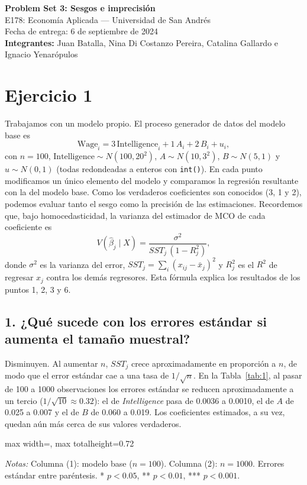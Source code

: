 \documentclass[11pt,a4paper]{article}
\newcommand{\tabla}[1]{\begin{adjustbox}{max width=\linewidth, max totalheight=0.72\textheight}\end{adjustbox}}
\newcommand{\notas}[1]{\par\vspace{0.3em}\begin{minipage}{0.92\linewidth}\footnotesize\textit{Notas:} #1\end{minipage}}
\begin{document}
\begin{center}
{\Large\bfseries Problem Set 3: Sesgos e imprecisión}\\[0.5em]
E178: Economía Aplicada --- Universidad de San Andrés\\
Fecha de entrega: 6 de septiembre de 2024\\[0.5em]
\textbf{Integrantes:} Juan Batalla, Nina Di Costanzo Pereira, Catalina Gallardo e Ignacio Yenarópulos
\end{center}

\section*{Ejercicio 1}

Trabajamos con un modelo propio. El proceso generador de datos del modelo base es
\[
\text{Wage}_i = 3\,\text{Intelligence}_i + 1\,A_i + 2\,B_i + u_i,
\]
con $n=100$, $\text{Intelligence}\sim N(100,20^2)$, $A\sim N(10,3^2)$, $B\sim N(5,1)$ y $u\sim N(0,1)$ (todas redondeadas a enteros con \texttt{int()}). En cada punto modificamos un único elemento del modelo y comparamos la regresión resultante con la del modelo base. Como los verdaderos coeficientes son conocidos (3, 1 y 2), podemos evaluar tanto el sesgo como la precisión de las estimaciones. Recordemos que, bajo homocedasticidad, la varianza del estimador de MCO de cada coeficiente es
\[
V(\hat\beta_j\mid X)=\frac{\sigma^2}{SST_j\,(1-R^2_j)},
\]
donde $\sigma^2$ es la varianza del error, $SST_j=\sum_i(x_{ij}-\bar x_j)^2$ y $R^2_j$ es el $R^2$ de regresar $x_j$ contra los demás regresores. Esta fórmula explica los resultados de los puntos 1, 2, 3 y 6.

\subsection*{1. ¿Qué sucede con los errores estándar si aumenta el tamaño muestral?}

Disminuyen. Al aumentar $n$, $SST_j$ crece aproximadamente en proporción a $n$, de modo que el error estándar cae a una tasa de $1/\sqrt{n}$. En la Tabla~\ref{tab:1}, al pasar de 100 a 1000 observaciones los errores estándar se reducen aproximadamente a un tercio ($1/\sqrt{10}\approx0.32$): el de \textit{Intelligence} pasa de 0.0036 a 0.0010, el de $A$ de 0.025 a 0.007 y el de $B$ de 0.060 a 0.019. Los coeficientes estimados, a su vez, quedan aún más cerca de sus valores verdaderos.

\begin{table}[H]\centering
\caption{Aumento del tamaño muestral}\label{tab:1}
\tabla{"../output/Tabla 1.tex"}
\notas{Columna (1): modelo base ($n=100$). Columna (2): $n=1000$. Errores estándar entre paréntesis. * $p<0.05$, ** $p<0.01$, *** $p<0.001$.}
\end{table}
\end{document}
